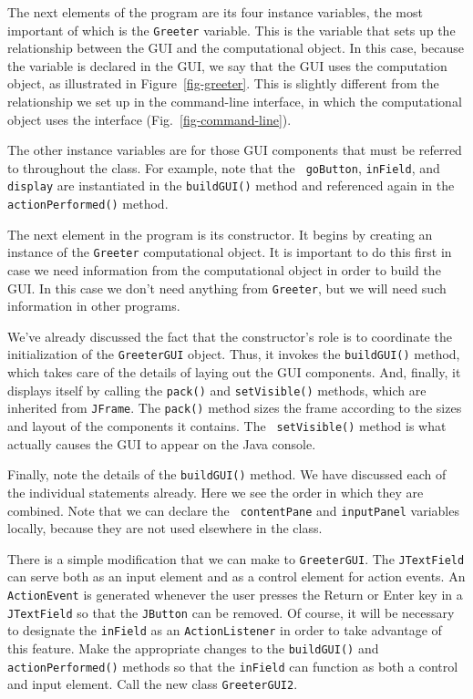 The next elements of the program are its four instance variables, the
most important of which is the {\tt Greeter} variable. This is the
variable that sets up the relationship between the GUI and the
computational object. In this case, because the variable is declared
in the GUI, we say that the GUI uses the computation object, as
illustrated in Figure~\ref{fig-greeter}.  This is slightly different
from the relationship we set up in the command-line interface, in
which the computational object uses the interface
(Fig.~\ref{fig-command-line}).

The other instance variables are for those GUI components that must be
referred to throughout the class. For example, note that the {\tt
goButton}, {\tt inField}, and {\tt display} are instantiated in the
{\tt buildGUI()} method and referenced again in the {\tt
actionPerformed()} method.

The next element in the program is its constructor. It begins by
creating an instance of the {\tt Greeter} computational object. It is
important to do this first in case we need information from the
computational object in order to build the GUI. In this case we don't
need anything from {\tt Greeter}, but we will need such information in
other programs.

We've already discussed the fact that the constructor's role is to
coordinate the initialization of the {\tt GreeterGUI} object. Thus, it
invokes the {\tt buildGUI()} method, which takes care of the details
of laying out the GUI components. And, finally, it displays itself by
calling the {\tt pack()} and {\tt setVisible()} methods, which are inherited
from {\tt JFrame}. The {\tt pack()} method sizes the frame according
to the sizes and layout of the components it contains. The {\tt
setVisible()} method is what actually causes the GUI to appear on the Java
console.

Finally, note the details of the {\tt buildGUI()} method. We have
discussed each of the individual statements already. Here we see the
order in which they are combined.  Note that we can declare the {\tt
contentPane} and {\tt inputPanel} variables locally, because they are
not used elsewhere in the class.

\label{self-study-exercises}
\begin{SSTUDY}
\item There is a simple modification that we can make to {\tt GreeterGUI}. 
The {\tt JTextField} can serve both as an input element and as a control 
element for action events. An {\tt ActionEvent}
is generated whenever the user presses the Return or Enter key in a
{\tt JTextField} so that the {\tt JButton} can be removed.  Of course, it 
will be necessary to designate the {\tt inField} as an {\tt ActionListener} 
in order to take advantage of this
feature.  Make the appropriate changes to the {\tt buildGUI()} and
{\tt actionPerformed()} methods so that the {\tt inField} can function
as both a control and input element.  Call the new class {\tt GreeterGUI2}.

\end{SSTUDY}


